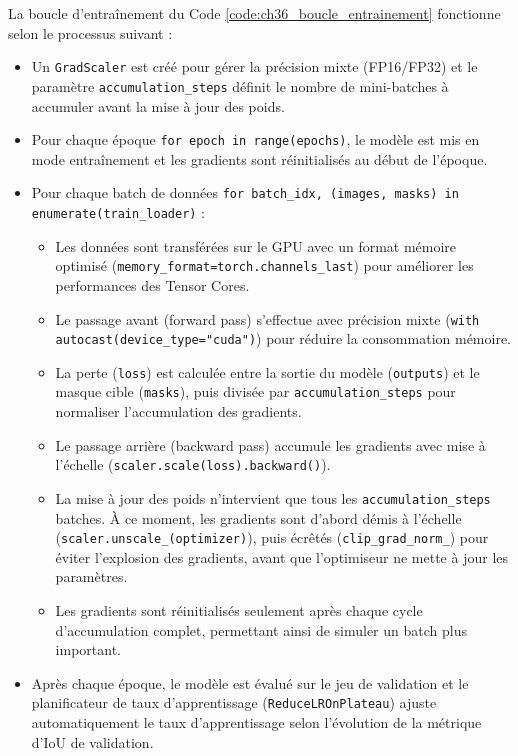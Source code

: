 La boucle d'entraînement du Code \ref{code:ch36_boucle_entrainement} fonctionne selon le processus suivant :
\begin{itemize}
    \item Un \texttt{GradScaler} est créé pour gérer la précision mixte (FP16/FP32) et le paramètre \texttt{accumulation\_steps} définit le nombre de mini-batches à accumuler avant la mise à jour des poids.
    \item Pour chaque époque \texttt{for epoch in range(epochs)}, le modèle est mis en mode entraînement et les gradients sont réinitialisés au début de l'époque.
    \item Pour chaque batch de données \texttt{for batch\_idx, (images, masks) in enumerate(train\_loader)} :
    \begin{itemize}
        \item Les données sont transférées sur le GPU avec un format mémoire optimisé (\texttt{memory\_format=torch.channels\_last}) pour améliorer les performances des Tensor Cores.
        \item Le passage avant (forward pass) s'effectue avec précision mixte (\texttt{with autocast(device\_type="cuda")}) pour réduire la consommation mémoire.
        \item La perte (\texttt{loss}) est calculée entre la sortie du modèle (\texttt{outputs}) et le masque cible (\texttt{masks}), puis divisée par \texttt{accumulation\_steps} pour normaliser l'accumulation des gradients.
        \item Le passage arrière (backward pass) accumule les gradients avec mise à l'échelle (\texttt{scaler.scale(loss).backward()}).
        \item La mise à jour des poids n'intervient que tous les \texttt{accumulation\_steps} batches. À ce moment, les gradients sont d'abord démis à l'échelle (\texttt{scaler.unscale\_(optimizer)}), puis écrêtés (\texttt{clip\_grad\_norm\_}) pour éviter l'explosion des gradients, avant que l'optimiseur ne mette à jour les paramètres.
        \item Les gradients sont réinitialisés seulement après chaque cycle d'accumulation complet, permettant ainsi de simuler un batch plus important.
    \end{itemize}
    \item Après chaque époque, le modèle est évalué sur le jeu de validation et le planificateur de taux d'apprentissage (\texttt{ReduceLROnPlateau}) ajuste automatiquement le taux d'apprentissage selon l'évolution de la métrique d'IoU de validation.
\end{itemize}

